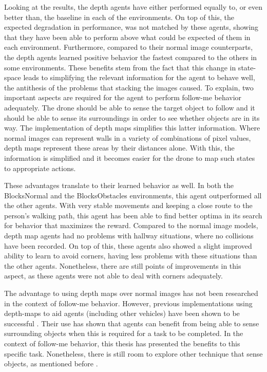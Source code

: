 Looking at the results, the depth agents have either performed equally to, 
or even better than, the baseline in each of the environments. On top of this, 
the expected degradation in performance, was not matched by these agents, showing 
that they have been able to perform above what could be expected of them in 
each environment. Furthermore, compared to their normal image counterparts, the 
depth agents learned positive behavior the fastest compared to the others in some 
environments. These benefits stem from the fact that this change in state-space 
leads to simplifying the relevant information for the agent to behave well, the antithesis of 
the problems that stacking the images caused. 
To explain, two important aspects are required for the agent to perform follow-me behavior 
adequately. The drone should be able to sense the target object to follow and 
it should be able to sense its surroundings in order to see whether objects 
are in its way. The implementation of depth maps simplifies this latter 
information. Where normal images can represent walls in a variety of combinations 
of pixel values, depth maps represent these areas by their distances alone. 
With this, the information is simplified and it becomes easier for the 
drone to map such states to appropriate actions. 

These advantages translate to their learned behavior as well. In both the BlocksNormal
and the BlocksObstacles environments, this agent outperformed all the other agents. 
With very stable movements and 
keeping a close route to the person's walking path, this agent has been able to 
find better optima in its search for behavior that maximizes the reward. Compared to 
the normal image models, depth map agents had no problems with hallway situations, 
where no collisions have been recorded. On top of this, these agents also 
showed a slight improved ability to learn to avoid corners, having less problems 
with these situations than the other agents. Nonetheless, there are still points of 
improvements in this aspect, as these agents were not able to deal with corners 
adequately. 

The advantage to using depth maps over normal images has not been researched in 
the context of follow-me behavior. However, previous implementations using 
depth-maps to aid agents (including other vehicles) have been shown to be 
successful \cite{AirSimDroneNavigation, DepthAndStackResearch}. Their use  
has shown that agents can benefit from being able to sense surrounding objects 
when this is required for a task to be completed. In the context of follow-me 
behavior, this thesis has presented the benefits to this specific task. Nonetheless, 
there is still room to explore other technique that sense objects, as mentioned before \cite{acousticdronefollower,lidarinselfdrivingcar}.

